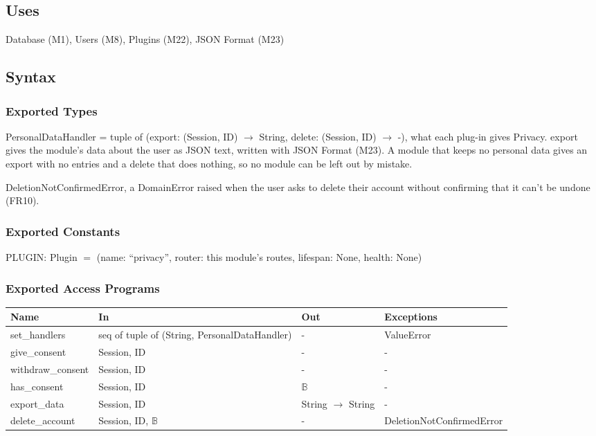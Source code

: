 \documentclass[12pt, titlepage]{article}
\begin{document}
\subsection{Uses}

Database (M1), Users (M8), Plugins (M22), JSON Format (M23)

\subsection{Syntax}

\subsubsection{Exported Types}

\noindent PersonalDataHandler = tuple of (export: (Session, ID)
$\rightarrow$ String, delete: (Session, ID) $\rightarrow$ -), what each
plug-in gives Privacy. export gives the module's data about the user as JSON
text, written with JSON Format (M23). A module that keeps no
personal data gives an export with no entries and a delete that does nothing,
so no module can be left out by mistake.

\medskip
\noindent DeletionNotConfirmedError, a DomainError raised when the user asks
to delete their account without confirming that it can't be undone (FR10).

\subsubsection{Exported Constants}

\noindent PLUGIN: Plugin $=$ (name: ``privacy'', router: this module's
routes, lifespan: None, health: None)

\subsubsection{Exported Access Programs}

\begin{center}
\small
\setlength{\tabcolsep}{3pt}
\begin{tabular}{>{\raggedright\arraybackslash}p{3.9cm}
  >{\raggedright\arraybackslash}p{3.7cm}
  >{\raggedright\arraybackslash}p{3.4cm}
  >{\raggedright\arraybackslash}p{4.3cm}}
\toprule
\textbf{Name} & \textbf{In} & \textbf{Out} & \textbf{Exceptions} \\
\midrule
set\_handlers & seq of tuple of (String, PersonalDataHandler) & - & ValueError \\
give\_consent & Session, ID & - & - \\
withdraw\_consent & Session, ID & - & - \\
has\_consent & Session, ID & $\mathbb{B}$ & - \\
export\_data & Session, ID & String $\rightarrow$ String & - \\
delete\_account & Session, ID, $\mathbb{B}$ & - &
DeletionNot\allowbreak ConfirmedError \\
\bottomrule
\end{tabular}
\end{center}
\end{document}
